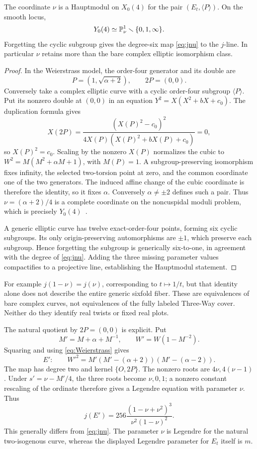 \begin{theorem}\label{thm:X04}
The coordinate \(\nu\) is a Hauptmodul on \(X_0(4)\) for the pair \((E_t,\langle P\rangle)\). On the smooth locus,
\[
Y_0(4)\simeq\mathbb P^1_\nu\smallsetminus\{0,1,\infty\}.
\]
Forgetting the cyclic subgroup gives the degree-six map \eqref{eq:jnu} to the \(j\)-line. In particular \(\nu\) retains more than the bare complex elliptic isomorphism class.
\end{theorem}
\begin{proof}
In the Weierstrass model, the order-four generator and its double are
\[
P=(1,\sqrt{\alpha+2}),\qquad2P=(0,0).
\]
Conversely take a complex elliptic curve with a cyclic order-four subgroup \(\langle P\rangle\). Put its nonzero double at \((0,0)\) in an equation \(Y^2=X(X^2+bX+c_0)\). The duplication formula gives
\[
X(2P)=\frac{(X(P)^2-c_0)^2}{4X(P)(X(P)^2+bX(P)+c_0)}=0,
\]
so \(X(P)^2=c_0\). Scaling by the nonzero \(X(P)\) normalizes the cubic to \(W^2=M(M^2+\alpha M+1)\), with \(M(P)=1\). A subgroup-preserving isomorphism fixes infinity, the selected two-torsion point at zero, and the common coordinate one of the two generators. The induced affine change of the cubic coordinate is therefore the identity, so it fixes \(\alpha\). Conversely \(\alpha\ne\pm2\) defines such a pair. Thus \(\nu=(\alpha+2)/4\) is a complete coordinate on the noncuspidal moduli problem, which is precisely \(Y_0(4)\)~\cite[\S19.3]{Sutherland}.

A generic elliptic curve has twelve exact-order-four points, forming six cyclic subgroups. Its only origin-preserving automorphisms are \(\pm1\), which preserve each subgroup. Hence forgetting the subgroup is generically six-to-one, in agreement with the degree of \eqref{eq:jnu}. Adding the three missing parameter values compactifies to a projective line, establishing the Hauptmodul statement.
\end{proof}

For example \(j(1-\nu)=j(\nu)\), corresponding to \(t\mapsto1/t\), but that identity alone does not describe the entire generic sixfold fiber. These are equivalences of bare complex curves, not equivalences of the fully labeled Three-Way cover. Neither do they identify real twists or fixed real plots.

The natural quotient by \(2P=(0,0)\) is explicit. Put
\[
M'=M+\alpha+M^{-1},\qquad W'=W(1-M^{-2}).
\]
Squaring and using \eqref{eq:Weierstrass} gives
\begin{equation}\label{eq:isogenous}
E':\qquad W'^2=M'(M'-(\alpha+2))(M'-(\alpha-2)).
\end{equation}
The map has degree two and kernel \(\{O,2P\}\). The nonzero roots are \(4\nu,4(\nu-1)\). Under \(s'=\nu-M'/4\), the three roots become \(\nu,0,1\); a nonzero constant rescaling of the ordinate therefore gives a Legendre equation with parameter \(\nu\). Thus
\begin{equation}\label{eq:jprime}
j(E')=256\frac{(1-\nu+\nu^2)^3}{\nu^2(1-\nu)^2}.
\end{equation}
This generally differs from \eqref{eq:jnu}. The parameter \(\nu\) is Legendre for the natural two-isogenous curve, whereas the displayed Legendre parameter for \(E_t\) itself is \(m\).

